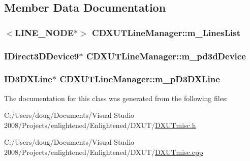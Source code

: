 \subsection{Member Data Documentation}
\hypertarget{class_c_d_x_u_t_line_manager_a529b6d8c2c733005bb6114809b70b58a}{
\subsubsection[{m\_\-LinesList}]{$<${\bf LINE\_\-NODE}$\ast$$>$ {\bf CDXUTLineManager::m\_\-LinesList}}}
\label{class_c_d_x_u_t_line_manager_a529b6d8c2c733005bb6114809b70b58a}
\hypertarget{class_c_d_x_u_t_line_manager_a14112175096fd07b59058fed2a83ae6d}{
\subsubsection[{m\_\-pd3dDevice}]{\setlength{\rightskip}{0pt plus 5cm}IDirect3DDevice9$\ast$ {\bf CDXUTLineManager::m\_\-pd3dDevice}}}
\label{class_c_d_x_u_t_line_manager_a14112175096fd07b59058fed2a83ae6d}
\hypertarget{class_c_d_x_u_t_line_manager_a34d87cec39b6a73c9f3dc3608859892a}{
\subsubsection[{m\_\-pD3DXLine}]{\setlength{\rightskip}{0pt plus 5cm}ID3DXLine$\ast$ {\bf CDXUTLineManager::m\_\-pD3DXLine}}}
\label{class_c_d_x_u_t_line_manager_a34d87cec39b6a73c9f3dc3608859892a}


The documentation for this class was generated from the following files:\begin{DoxyCompactItemize}
\item 
C:/Users/doug/Documents/Visual Studio 2008/Projects/enlightened/Enlightened/DXUT/\hyperlink{_d_x_u_tmisc_8h}{DXUTmisc.h}\item 
C:/Users/doug/Documents/Visual Studio 2008/Projects/enlightened/Enlightened/DXUT/\hyperlink{_d_x_u_tmisc_8cpp}{DXUTmisc.cpp}\end{DoxyCompactItemize}
